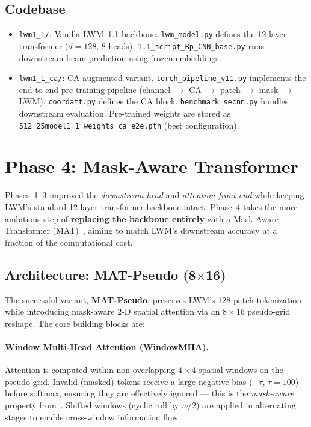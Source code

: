 \documentclass[12pt,a4paper]{article}
\begin{document}
\subsection{Codebase}\label{subsec:code_p3}

\begin{itemize}[leftmargin=1.2em]
    \item \texttt{lwm1\_1/}: Vanilla LWM~1.1 backbone. \texttt{lwm\_model.py} defines the 12-layer transformer ($d{=}128$, 8 heads). \texttt{1.1\_script\_Bp\_CNN\_base.py} runs downstream beam prediction using frozen embeddings.
    \item \texttt{lwm1\_1\_ca/}: CA-augmented variant. \texttt{torch\_pipeline\_v11.py} implements the end-to-end pre-training pipeline (channel $\to$ CA $\to$ patch $\to$ mask $\to$ LWM). \texttt{coordatt.py} defines the CA block. \texttt{benchmark\_secnn.py} handles downstream evaluation. Pre-trained weights are stored as \texttt{512\_25model1\_1\_weights\_ca\_e2e.pth} (best configuration).
\end{itemize}

\newpage
\section{Phase 4: Mask-Aware Transformer}\label{sec:phase4}

Phases~1--3 improved the \emph{downstream head} and \emph{attention front-end} while keeping LWM's standard 12-layer transformer backbone intact. Phase~4 takes the more ambitious step of \textbf{replacing the backbone entirely} with a Mask-Aware Transformer (MAT)~\cite{mat}, aiming to match LWM's downstream accuracy at a fraction of the computational cost.

\subsection{\texorpdfstring{Architecture: MAT-Pseudo (8$\times$16)}{Architecture: MAT-Pseudo (8x16)}}\label{subsec:mat_arch}

The successful variant, \textbf{MAT-Pseudo}, preserves LWM's 128-patch tokenization while introducing mask-aware 2-D spatial attention via an $8{\times}16$ pseudo-grid reshape. The core building blocks are:

\paragraph{Window Multi-Head Attention (WindowMHA).}
Attention is computed within non-overlapping $4{\times}4$ spatial windows on the pseudo-grid. Invalid (masked) tokens receive a large negative bias ($-\tau$, $\tau{=}100$) before softmax, ensuring they are effectively ignored --- this is the \emph{mask-aware} property from~\cite{mat}. Shifted windows (cyclic roll by $w/2$) are applied in alternating stages to enable cross-window information flow.
\end{document}
